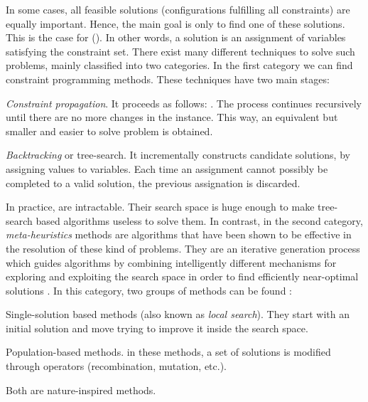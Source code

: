 In some cases, all feasible solutions (\ie configurations fulfilling all constraints) are equally important. Hence, the main goal is only to find  one of these solutions. This is the case for {\it \CSPs{}} (\csp). In other words, a solution is an assignment of variables satisfying the constraint set. There exist many different techniques to solve such problems, mainly classified into two categories. In the first category we can find constraint programming methods. These techniques have two main stages: %
\begin{inparaenum}[a)] \item \textit{Constraint propagation}. It proceeds as follows: . The process continues recursively until there are no more changes in the instance. This way, an equivalent but smaller and easier to solve problem is obtained. \item \textit{Backtracking} or tree-search. It incrementally constructs candidate solutions, by assigning values to variables. Each time an assignment cannot possibly be completed to a valid solution, the previous assignation is discarded. \end{inparaenum} 

In practice, \CSPs{} are intractable. Their search space is huge enough to make tree-search based algorithms useless to solve them. In contrast, in the second category, \textit{meta-heuristics} methods are algorithms that have been shown to be effective in the resolution of these kind of problems. They are an iterative generation process which guides algorithms by combining intelligently different mechanisms for exploring and exploiting the search space in order to find efficiently near-optimal solutions \cite{Osman1996}. In this category, two groups of methods can be found \cite{Boussaid2013}: \begin{inparaenum}[a)] \item Single-solution based methods (also known as \textit{local search}). They start with an initial solution and move trying to improve it inside the search space. \item Population-based methods. in these methods, a set of solutions is modified through operators (recombination, mutation, etc.). \end{inparaenum} Both are nature-inspired methods.

